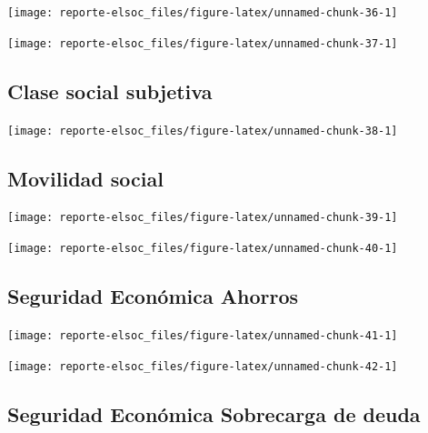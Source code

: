 \documentclass[
  12pt,
]{book}
\begin{document}
\begin{center}\texttt{[image: reporte-elsoc\_files/figure-latex/unnamed-chunk-36-1]} \end{center}

\begin{center}\texttt{[image: reporte-elsoc\_files/figure-latex/unnamed-chunk-37-1]} \end{center}

\hypertarget{clase-social-subjetiva}{%
\subsection{Clase social subjetiva}\label{clase-social-subjetiva}}

\begin{center}\texttt{[image: reporte-elsoc\_files/figure-latex/unnamed-chunk-38-1]} \end{center}

\hypertarget{movilidad-social}{%
\subsection{Movilidad social}\label{movilidad-social}}

\begin{center}\texttt{[image: reporte-elsoc\_files/figure-latex/unnamed-chunk-39-1]} \end{center}

\begin{center}\texttt{[image: reporte-elsoc\_files/figure-latex/unnamed-chunk-40-1]} \end{center}

\hypertarget{seguridad-econuxf3mica-ahorros}{%
\subsection{Seguridad Económica Ahorros}\label{seguridad-econuxf3mica-ahorros}}

\begin{center}\texttt{[image: reporte-elsoc\_files/figure-latex/unnamed-chunk-41-1]} \end{center}

\begin{center}\texttt{[image: reporte-elsoc\_files/figure-latex/unnamed-chunk-42-1]} \end{center}

\hypertarget{seguridad-econuxf3mica-sobrecarga-de-deuda}{%
\subsection{Seguridad Económica Sobrecarga de deuda}\label{seguridad-econuxf3mica-sobrecarga-de-deuda}}
\end{document}
